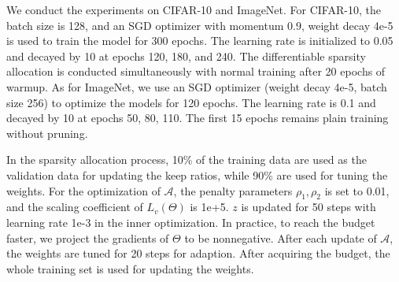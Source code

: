 \documentclass[runningheads]{llncs}
\newcommand{\alphas}{\mathcal{A}}
\newcommand{\invas}{\Theta}
\begin{document}
  
  
  We conduct the experiments on CIFAR-10 and ImageNet. 
  For CIFAR-10, the batch size is 128, and an SGD optimizer with momentum 0.9, weight decay 4e-5 is used to train the model for 300 epochs. The learning rate is initialized to 0.05 
  and decayed by 10 at epochs 120, 180, and 240. The differentiable sparsity allocation is conducted simultaneously with normal training after 20 epochs of warmup. 
  As for ImageNet, we use an SGD optimizer (weight decay 4e-5, batch size 256) to optimize the models for 120 epochs. The learning rate is 0.1 and decayed by 10 at epochs 50, 80, 110. The first 15 epochs remains plain training without pruning. 
  
  In the sparsity allocation process, 10\% of the training data are used as the validation data for updating the keep ratios, while 90\% are used for tuning the weights. For the optimization of $\alphas$, the penalty parameters $\rho_1, \rho_2$ is set to 0.01, and the scaling coefficient of $L_v(\invas)$ is 1e+5. $z$ is updated for 50 steps with learning rate 1e-3 in the inner optimization. In practice, to reach the budget faster, we project the gradients of $\invas$ to be nonnegative. After each update of $\alphas$, the weights are tuned for 20 steps for adaption. After acquiring the budget, the whole training set is used for updating the weights. 
  
\end{document}
